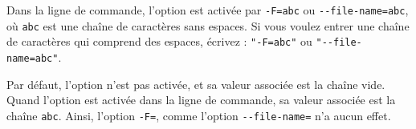 Dans la ligne de commande, l'option est activée par \texttt{-F=abc} ou \texttt{-{}-file-name=abc}, où \texttt{abc} est une chaîne de caractères sans espaces. Si vous voulez entrer une chaîne de caractères qui comprend des espaces, écrivez : \texttt{"-F=abc"} ou \texttt{"-{}-file-name=abc"}.

Par défaut, l'option n'est pas activée, et sa valeur associée est la chaîne vide. Quand l'option est activée dans la ligne de commande, sa valeur associée est la chaîne \texttt{abc}. Ainsi, l'option \texttt{-F=}, comme l'option \texttt{-{}-file-name=} n'a aucun effet.


